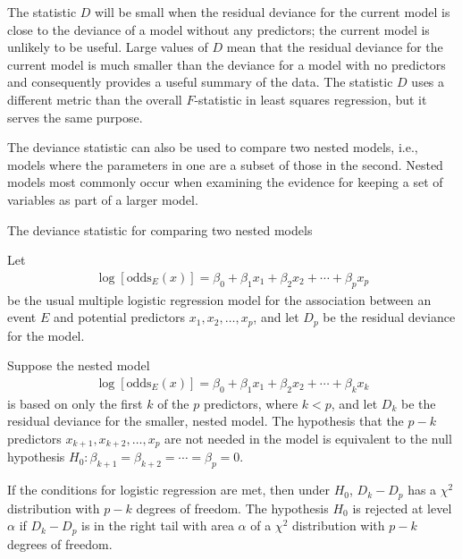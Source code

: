 The statistic $D$ will be small when the residual deviance for the current model is close to the deviance of a model without any predictors; the current model is unlikely to be useful.  Large values of $D$ mean that the residual deviance for the current model is much smaller than the deviance for a model with no predictors and consequently provides a useful summary of the data.  The statistic $D$ uses a different metric than the overall $F$-statistic in least squares regression, but it serves the same purpose.

The deviance statistic can also be used to compare two nested models, i.e., models where the parameters in one are a subset of those  in the second.  Nested models most commonly occur when examining the evidence for keeping a set of variables as part of a larger model.

\begin{onebox}{The deviance statistic for comparing two nested models}

Let
  \begin{align}
     \log\left[\text{odds}_E(x)\right] = \beta_0 + \beta_1 x_1 +
      \beta_2 x_2 + \cdots + \beta_p x_p
      \label{eqn:nestedModelPPredictors}
  \end{align}
  be the usual multiple logistic regression model for the association between an event $E$ and potential predictors $x_1, x_2, \ldots, x_p$, and let $D_p$ be the residual deviance for the model.

  Suppose the nested model
  \begin{align}
     \log\left[\text{odds}_E(x)\right] = \beta_0 + \beta_1 x_1 +
      \beta_2 x_2 + \cdots + \beta_k x_k
      \label{eqn:nestedModelKPredictors}
  \end{align}
  is based on only the first $k$ of the $p$ predictors, where $k<p$, and let $D_k$ be the residual deviance for the smaller, nested model.   The hypothesis that the $p - k$ predictors $x_{k+1}, x_{k+2}, \ldots, x_{p}$ are not needed in the model is equivalent to the null hypothesis $H_0: \beta_{k+1} = \beta_{k+2} = \cdots  = \beta_p = 0$.
  \vspace{0.1in}

 If the conditions for logistic regression are met, then under $H_0$, $D_k - D_p$ has a $\chi^2$ distribution with $p - k$ degrees of freedom.  The hypothesis $H_0$  is rejected at level $\alpha$ if $D_k - D_p$ is in the right tail with area $\alpha$ of a $\chi^2$ distribution with $p - k$ degrees of freedom.
\end{onebox}

